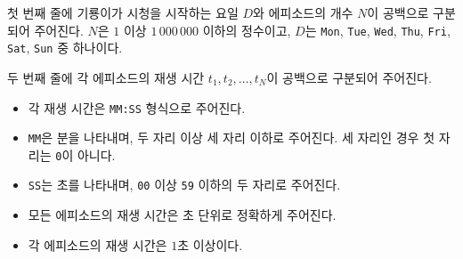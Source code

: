 
첫 번째 줄에 기룡이가 시청을 시작하는 요일 $D$와 에피소드의 개수 $N$이 공백으로 구분되어 주어진다.  
$N$은 $1$ 이상 $1\,000\,000$ 이하의 정수이고, $D$는 \texttt{Mon}, \texttt{Tue}, \texttt{Wed}, \texttt{Thu}, \texttt{Fri}, \texttt{Sat}, \texttt{Sun} 중 하나이다.

두 번째 줄에 각 에피소드의 재생 시간 $t_1, t_2, \ldots, t_N$이 공백으로 구분되어 주어진다.

\begin{itemize}
    \item 각 재생 시간은 \texttt{MM:SS} 형식으로 주어진다.
    \item \texttt{MM}은 분을 나타내며, 두 자리 이상 세 자리 이하로 주어진다. 세 자리인 경우 첫 자리는 \texttt{0}이 아니다.
    \item \texttt{SS}는 초를 나타내며, \texttt{00} 이상 \texttt{59} 이하의 두 자리로 주어진다.
    \item 모든 에피소드의 재생 시간은 초 단위로 정확하게 주어진다.
    \item 각 에피소드의 재생 시간은 $1$초 이상이다.
\end{itemize}